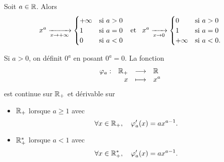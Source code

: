 \documentclass{magnolia}
\begin{document}


\begin{proposition}[utile=-3]
Soit $a\in\mathbb{R}$. Alors
\[x^a \xrightarrow[x\rightarrow +\infty]{}
  \begin{cases}
  +\infty & \text{si $a>0$}\\
  1 & \text{si $a=0$}\\
  0 & \text{si $a<0$}
  \end{cases} \quad\!\text{et}\quad\!
  x^a \xrightarrow[x\rightarrow 0]{}
  \begin{cases}
  0 & \text{si $a>0$}\\
  1 & \text{si $a=0$}\\
  +\infty & \text{si $a<0$.}
  \end{cases}\]
\end{proposition}


\begin{remarqueUnique}
\remarque Si $a>0$, on définit $0^a$ en posant $0^a=0$. La fonction
  \[\begin{array}[t]{lrcl} \displaystyle{\varphi_a} : & \displaystyle{\mathbb{R}_+} & \longrightarrow & \displaystyle{\mathbb{R}} \\ & \displaystyle{x} & \longmapsto & \displaystyle{x^a} \end{array}\]
  est continue sur $\mathbb{R}_+$ et dérivable sur
  \begin{itemize}
  \item $\mathbb{R}_+$ lorsque $a\geq 1$ avec
    \[\forall x\in\mathbb{R}_+ ,\quad \varphi_a'(x)=a x^{a-1}.\]
  \item $\mathbb{R}_+^*$ lorsque $a<1$ avec
    \[\forall x\in\mathbb{R}_+^* ,\quad \varphi_a'(x)=a x^{a-1}.\]
  \end{itemize}
\end{remarqueUnique}
\end{document}

